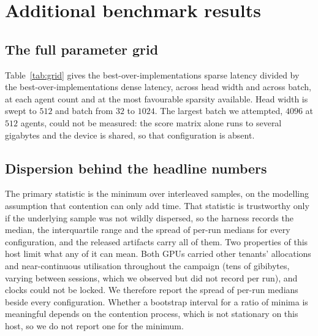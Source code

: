 \section{Additional benchmark results}
\label{app:grid}

\subsection{The full parameter grid}

Table~\ref{tab:grid} gives the best-over-implementations sparse latency divided
by the best-over-implementations dense latency, across head width and across
batch, at each agent count and at the most favourable sparsity available. Head
width is swept to $512$ and batch from $32$ to $1024$. The largest batch we
attempted, $4096$ at $512$ agents, could not be measured: the score matrix alone
runs to several gigabytes and the device is shared, so that configuration is
absent.

\begin{table}[ht]
\centering\small
\caption{Best sparse divided by best dense, over head width (upper block) and
batch (lower block). Values below one indicate sparsity winning. The $96$-agent
column is included for completeness and carries no claim, for the reason given
in Appendix~\ref{app:drift}. Each column comes from the sweep that varies that
axis, so a figure here can differ from the same nominal quantity in Section~\ref{sec:fused} by the few per cent that separates two sessions. The searched dense tiling exists only at batch $256$, so in the batch block our dense kernel runs at its default tiling except at batch $256$; in the head-width block it is missing at four configurations with $d \ge 64$, where the search's winner was the library kernel, which is in the baseline.}
\label{tab:grid}

\end{table}

\subsection{Dispersion behind the headline numbers}
\label{app:dispersion}

The primary statistic is the minimum over interleaved samples, on the modelling
assumption that contention can only add time. That statistic is trustworthy only
if the underlying sample was not wildly dispersed, so the harness records the
median, the interquartile range and the spread of per-run medians for every
configuration, and the released artifacts carry all of them. Two properties of
this host limit what any of it can mean. Both GPUs carried other tenants' allocations and near-continuous utilisation
throughout the campaign (tens of gibibytes, varying between sessions, which
we observed but did not record per run), and clocks could not be locked. We therefore report the spread of
per-run medians beside every configuration. Whether a bootstrap interval for a
ratio of minima is meaningful depends on the contention process, which is not
stationary on this host, so we do not report one for the minimum.

